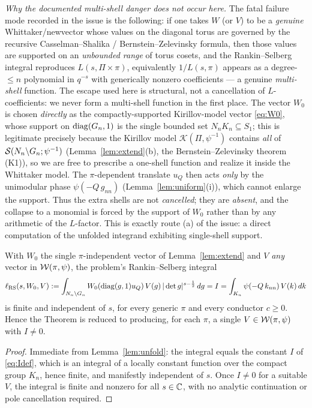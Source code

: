 \noindent\emph{Why the documented multi-shell danger does not occur here.} The fatal failure mode
recorded in the issue is the following: if one takes $W$ \textup{(}or $V$\textup{)} to be a
\emph{genuine} Whittaker/newvector whose values on the diagonal torus are governed by the
recursive Casselman--Shalika / Bernstein--Zelevinsky formula, then those values are supported on
an \emph{unbounded range} of torus cosets, and the Rankin--Selberg integral reproduces
$L(s,\Pi\times\pi)$, equivalently $1/L(s,\pi)$ appears as a degree-$\le n$ polynomial in $q^{-s}$
with generically nonzero coefficients --- a genuine \emph{multi-shell} function. The escape used
here is structural, not a cancellation of $L$-coefficients\textup{:} we never form a multi-shell
function in the first place. The vector $W_0$ is chosen \emph{directly} as the
compactly-supported Kirillov-model vector \eqref{eq:W0}, whose support on $\operatorname{diag}(G_n,1)$ is the
single bounded set $N_nK_n\subseteq S_1$; this is legitimate precisely because the Kirillov model
$\mathcal K(\Pi,\psi^{-1})$ contains \emph{all} of $\mathcal{S}(N_n\backslash G_n;\psi^{-1})$
\textup{(}Lemma~\ref{lem:extend}(b), the Bernstein--Zelevinsky theorem (K1)\textup{)}, so we are
free to prescribe a one-shell function and realize it inside the Whittaker model. The
$\pi$-dependent translate $u_Q$ then acts \emph{only} by the unimodular phase
$\psi(-Q\,g_{nn})$ \textup{(}Lemma~\ref{lem:uniform}(i)\textup{)}, which cannot enlarge the
support. Thus the extra shells are not \emph{cancelled}; they are \emph{absent}, and the collapse
to a monomial is forced by the support of $W_0$ rather than by any arithmetic of the
$L$-factor. This is exactly route \textup{(a)} of the issue: a direct computation of the unfolded
integrand exhibiting single-shell support.

\begin{qtwocorollary}\label{cor:sindep}
With $W_0$ the single $\pi$-independent vector of Lemma~\ref{lem:extend} and $V$ \emph{any}
vector in $\mathcal{W}(\pi,\psi)$, the problem's Rankin--Selberg integral
\[
\ell_{\mathrm{RS}}(s,W_0,V):=\int_{N_n\backslash G_n}W_0(\operatorname{diag}(g,1)u_Q)\,V(g)\,|\det g|^{s-\frac12}\,dg
=I=\int_{K_n}\psi(-Q\,k_{nn})\,V(k)\,dk
\]
is finite and independent of $s$, for every generic $\pi$ and every conductor $c\ge0$. Hence the
Theorem is reduced to producing, for each $\pi$, a single $V\in\mathcal{W}(\pi,\psi)$ with $I\neq0$.
\end{qtwocorollary}

\begin{proof}
Immediate from Lemma~\ref{lem:unfold}: the integral equals the constant $I$ of \eqref{eq:Idef},
which is an integral of a locally constant function over the compact group $K_n$, hence finite,
and manifestly independent of $s$. Once $I\neq0$ for a suitable $V$, the integral is finite and
nonzero for all $s\in\mathbb{C}$, with no analytic continuation or pole cancellation required.
\end{proof}

